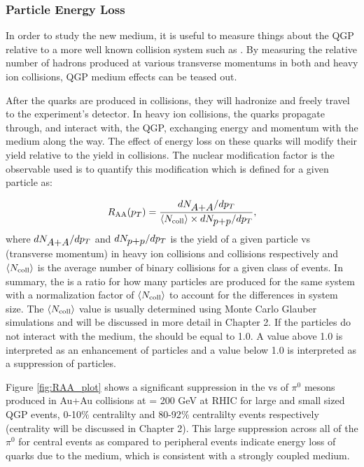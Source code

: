 \subsubsection{Particle Energy Loss}
In order to study the new medium, it is useful to measure things about the QGP relative to a more well known collision system such as \pp. By measuring the relative number of hadrons produced at various transverse momentums in both \pp and heavy ion collisions, QGP medium effects can be teased out.

After the quarks are produced in \pp collisions, they will hadronize and freely travel to the experiment's detector. In heavy ion collisions, the quarks propagate through, and interact
with, the QGP, exchanging energy and momentum with the medium along the way. The effect of energy loss on these quarks will modify their yield relative to the yield in \pp collisions. The nuclear modification factor \raa is the observable used is to quantify this modification which is defined for a given particle as:

\begin{equation}\label{eqn:raa}
 \mbox{$R_{\rm AA}$}(\mbox{$p_T$}) = \frac{dN_{\mbox{$A$+$A$}}/d\mbox{$p_T$}}{\left<\mbox{$N_{\rm coll}$}\right>\times dN_{\mbox{$p$+$p$}}/d\mbox{$p_T$}},
\end{equation}
where $dN_{\mbox{$A$+$A$}}/d\mbox{$p_T$}$ and $dN_{\mbox{$p$+$p$}}/d\mbox{$p_T$}$ is the yield of a given particle vs \pt (transverse momentum) in heavy ion collisions and \pp collisions respectively and $\left<\mbox{$N_{\rm coll}$}\right>$ is the average number of binary collisions for a given class of events. In summary, the \raa is a ratio for how many particles are produced for the same system with a normalization factor of $\left<\mbox{$N_{\rm coll}$}\right>$ to account for the differences in system size. The $\left<\mbox{$N_{\rm coll}$}\right>$ value is usually determined using Monte Carlo Glauber simulations and will be discussed in more detail in Chapter 2. If the particles do not interact with the medium, the \raa should be equal to 1.0. A value above 1.0 is interpreted as an enhancement of particles and a value below 1.0 is interpreted as a suppression of particles. 

Figure \ref{fig:RAA_plot} shows a significant suppression in the \raa vs \pt  of $\pi^0$ mesons produced in Au+Au collisions at \sqsn = 200 GeV at RHIC for large and small sized QGP events, 0-10$\%$ centralilty and 80-92$\%$ centralilty events respectively (centrality will be discussed in Chapter 2). This large suppression across all  \pt of the $\pi^0$ for central events as compared to peripheral events indicate energy loss of quarks due to the medium, which is consistent with a strongly coupled  medium.

